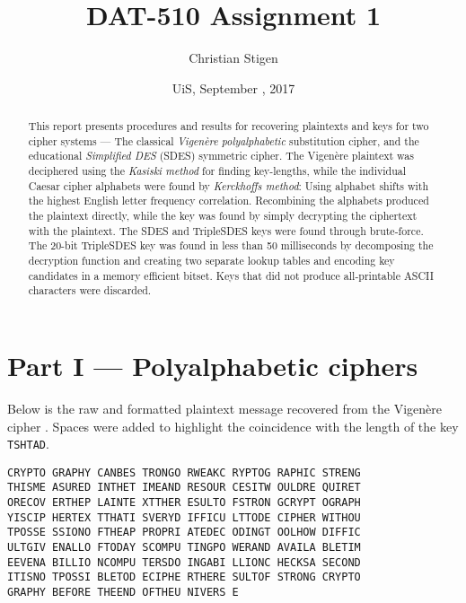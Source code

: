 \documentclass[a4paper,english,12pt]{article}
\title{DAT-510 Assignment 1}
\author{Christian Stigen}
\date{UiS, September \nth{18}, 2017}
\begin{document}
\maketitle


\begin{abstract}
  This report presents procedures and results for recovering plaintexts and keys
  for two cipher systems --- The classical \textit{Vigenère polyalphabetic}
  substitution cipher, and the educational \textit{Simplified DES} (SDES) symmetric cipher.
%
  The Vigenère plaintext was deciphered using the \textit{Kasiski method} for
  finding key-lengths, while the individual Caesar cipher alphabets were found by
  \textit{Kerckhoffs method}: Using alphabet shifts with the highest English
  letter frequency correlation. Recombining the alphabets produced the
  plaintext directly, while the key was found by simply decrypting the
  ciphertext with the plaintext.
%
  The SDES and TripleSDES keys were found through brute-force. The 20-bit
  TripleSDES key was found in less than 50 milliseconds by decomposing the
  decryption function and creating two separate lookup tables and encoding key
  candidates in a memory efficient bitset. Keys that did not produce
  all-printable ASCII characters were discarded.
\end{abstract}

\section{Part I --- Polyalphabetic ciphers}

Below is the raw and formatted plaintext message recovered from the Vigenère
cipher \cite{wiki:vigenere, wiki:polyalphabetic}. Spaces were added to highlight
the coincidence with the length of the key \texttt{TSHTAD}.

\begin{verbatim}
CRYPTO GRAPHY CANBES TRONGO RWEAKC RYPTOG RAPHIC STRENG
THISME ASURED INTHET IMEAND RESOUR CESITW OULDRE QUIRET
ORECOV ERTHEP LAINTE XTTHER ESULTO FSTRON GCRYPT OGRAPH
YISCIP HERTEX TTHATI SVERYD IFFICU LTTODE CIPHER WITHOU
TPOSSE SSIONO FTHEAP PROPRI ATEDEC ODINGT OOLHOW DIFFIC
ULTGIV ENALLO FTODAY SCOMPU TINGPO WERAND AVAILA BLETIM
EEVENA BILLIO NCOMPU TERSDO INGABI LLIONC HECKSA SECOND
ITISNO TPOSSI BLETOD ECIPHE RTHERE SULTOF STRONG CRYPTO
GRAPHY BEFORE THEEND OFTHEU NIVERS E
\end{verbatim}
\end{document}
